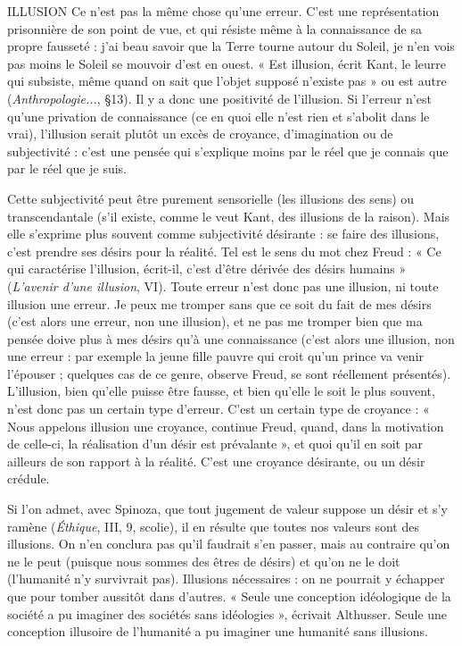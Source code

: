 ILLUSION Ce n’est pas la même chose qu’une erreur. C’est une représentation
prisonnière de son point de vue, et qui résiste même à la
connaissance de sa propre fausseté : j’ai beau savoir que la Terre tourne autour
du Soleil, je n’en vois pas moins le Soleil se mouvoir d’est en ouest. « Est illusion,
écrit Kant, le leurre qui subsiste, même quand on sait que l’objet supposé
n'existe pas » ou est autre ({\it Anthropologie...}, \S 13). Il y a donc une positivité de
l'illusion. Si l'erreur n’est qu’une privation de connaissance (ce en quoi elle
n'est rien et s’abolit dans le vrai), l'illusion serait plutôt un excès de croyance,
d'imagination ou de subjectivité : c’est une pensée qui s'explique moins par le
réel que je connais que par le réel que je suis.

Cette subjectivité peut être purement sensorielle (les illusions des sens) ou
transcendantale (s’il existe, comme le veut Kant, des illusions de la raison).
Mais elle s'exprime plus souvent comme subjectivité désirante : se faire des illusions,
c’est prendre ses désirs pour la réalité. Tel est le sens du mot chez Freud :
« Ce qui caractérise l'illusion, écrit-il, c’est d’être dérivée des désirs humains »
({\it L'avenir d'une illusion}, VI). Toute erreur n’est donc pas une illusion, ni toute
illusion une erreur. Je peux me tromper sans que ce soit du fait de mes désirs
(c'est alors une erreur, non une illusion), et ne pas me tromper bien que ma
pensée doive plus à mes désirs qu’à une connaissance (c’est alors une illusion,
non une erreur : par exemple la jeune fille pauvre qui croit qu’un prince va
venir l’épouser ; quelques cas de ce genre, observe Freud, se sont réellement
présentés). L’illusion, bien qu’elle puisse être fausse, et bien qu’elle le soit le
plus souvent, n’est donc pas un certain type d’erreur. C’est un certain type de
croyance : « Nous appelons illusion une croyance, continue Freud, quand, dans
la motivation de celle-ci, la réalisation d’un désir est prévalante », et quoi qu’il
en soit par ailleurs de son rapport à la réalité. C’est une croyance désirante, ou
un désir crédule.

Si l’on admet, avec Spinoza, que tout jugement de valeur suppose un désir
et s’y ramène ({\it Éthique}, III, 9, scolie), il en résulte que toutes nos valeurs sont
des illusions. On n’en conclura pas qu’il faudrait s’en passer, mais au contraire
qu'on ne le peut (puisque nous sommes des êtres de désirs) et qu’on ne le doit
(l'humanité n’y survivrait pas). Illusions nécessaires : on ne pourrait y échapper
que pour tomber aussitôt dans d’autres. « Seule une conception idéologique de
la société a pu imaginer des sociétés sans idéologies », écrivait Althusser. Seule
une conception illusoire de l'humanité a pu imaginer une humanité sans illusions.

